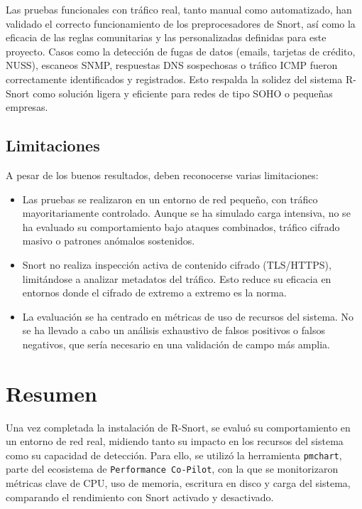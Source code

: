 \documentclass[11pt,a4paper,twoside]{report}
\begin{document}
Las pruebas funcionales con tráfico real, tanto manual como automatizado, han validado el correcto funcionamiento de los preprocesadores de Snort, así como la eficacia de las reglas comunitarias y las personalizadas definidas para este proyecto. Casos como la detección de fugas de datos (emails, tarjetas de crédito, NUSS), escaneos SNMP, respuestas DNS sospechosas o tráfico ICMP fueron correctamente identificados y registrados. Esto respalda la solidez del sistema R-Snort como solución ligera y eficiente para redes de tipo SOHO o pequeñas empresas.

\subsection*{Limitaciones}

A pesar de los buenos resultados, deben reconocerse varias limitaciones:

\begin{itemize}
	\item Las pruebas se realizaron en un entorno de red pequeño, con tráfico mayoritariamente controlado. Aunque se ha simulado carga intensiva, no se ha evaluado su comportamiento bajo ataques combinados, tráfico cifrado masivo o patrones anómalos sostenidos.
	\item Snort no realiza inspección activa de contenido cifrado (TLS/HTTPS), limitándose a analizar metadatos del tráfico. Esto reduce su eficacia en entornos donde el cifrado de extremo a extremo es la norma.
	\item La evaluación se ha centrado en métricas de uso de recursos del sistema. No se ha llevado a cabo un análisis exhaustivo de falsos positivos o falsos negativos, que sería necesario en una validación de campo más amplia.
\end{itemize}

\pagebreak

\section{Resumen}

Una vez completada la instalación de R-Snort, se evaluó su comportamiento en un entorno de red real, midiendo tanto su impacto en los recursos del sistema como su capacidad de detección. Para ello, se utilizó la herramienta \texttt{pmchart}, parte del ecosistema de \texttt{Performance Co-Pilot}, con la que se monitorizaron métricas clave de CPU, uso de memoria, escritura en disco y carga del sistema, comparando el rendimiento con Snort activado y desactivado.\newline
\end{document}

